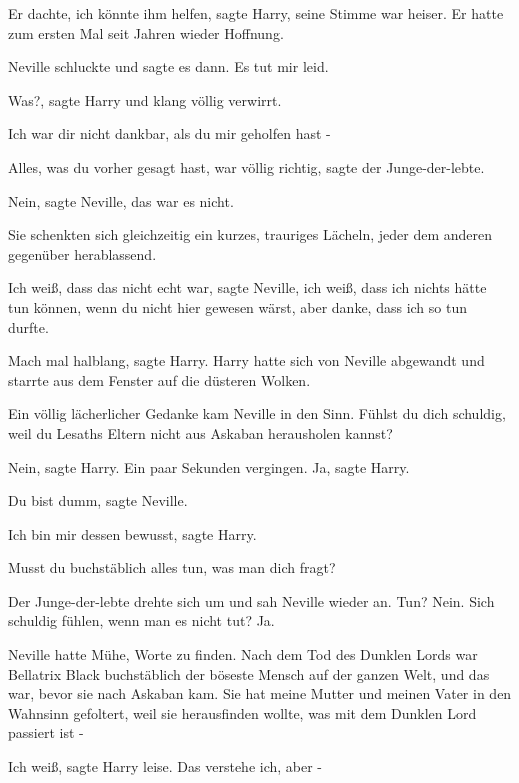 \glqq{}Er dachte, ich könnte ihm helfen\grqq{}, sagte Harry, seine Stimme war
heiser. \glqq{}Er hatte zum ersten Mal seit Jahren wieder Hoffnung.\grqq{}

Neville schluckte und sagte es dann. \glqq{}Es tut mir leid.\grqq{}

\glqq{}Was?\grqq{}, sagte Harry und klang völlig verwirrt.

\glqq{}Ich war dir nicht dankbar, als du mir geholfen hast -\grqq{}

\glqq{}Alles, was du vorher gesagt hast, war völlig richtig\grqq{}, sagte der
Junge-der-lebte.

\glqq{}Nein\grqq{}, sagte Neville, \glqq{}das war es nicht.\grqq{}

Sie schenkten sich gleichzeitig ein kurzes, trauriges Lächeln, jeder dem anderen
gegenüber herablassend.

\glqq{}Ich weiß, dass das nicht echt war\grqq{}, sagte Neville, \glqq{}ich weiß,
dass ich nichts hätte tun können, wenn du nicht hier gewesen wärst, aber danke,
dass ich so tun durfte.\grqq{}

\glqq{}Mach mal halblang\grqq{}, sagte Harry. Harry hatte sich von Neville
abgewandt und starrte aus dem Fenster auf die düsteren Wolken.

Ein völlig lächerlicher Gedanke kam Neville in den Sinn. \glqq{}Fühlst du dich
schuldig, weil du Lesaths Eltern nicht aus Askaban herausholen kannst?\grqq{}

\glqq{}Nein\grqq{}, sagte Harry. Ein paar Sekunden vergingen. \glqq{}Ja\grqq{},
sagte Harry.

\glqq{}Du bist dumm\grqq{}, sagte Neville.

\glqq{}Ich bin mir dessen bewusst\grqq{}, sagte Harry.

\glqq{}Musst du buchstäblich alles tun, was man dich fragt?\grqq{}

Der Junge-der-lebte drehte sich um und sah Neville wieder an. \glqq{}Tun? Nein.
Sich schuldig fühlen, wenn man es nicht tut? Ja.\grqq{}

Neville hatte Mühe, Worte zu finden. \glqq{}Nach dem Tod des Dunklen Lords war
Bellatrix Black buchstäblich der böseste Mensch auf der ganzen Welt, und das
war, bevor sie nach Askaban kam. Sie hat meine Mutter und meinen Vater in den
Wahnsinn gefoltert, weil sie herausfinden wollte, was mit dem Dunklen Lord
passiert ist -\grqq{}

\glqq{}Ich weiß\grqq{}, sagte Harry leise. \glqq{}Das verstehe ich, aber
-\grqq{}

